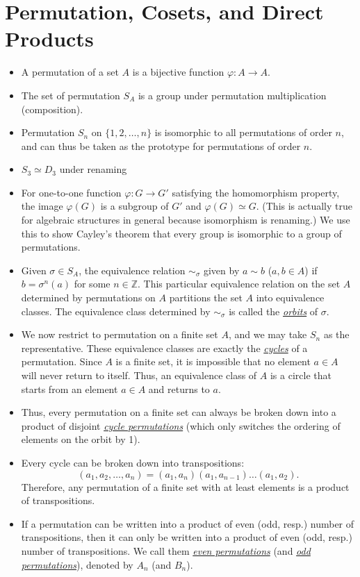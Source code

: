 \documentclass{article}
\newcommand{\df}[1]{\ul{\textit{#1}}}
\newcommand{\Z}{\mathbb{Z}}
\renewcommand{\phi}{\varphi}
\begin{document}
\section{Permutation, Cosets, and Direct Products}
\begin{itemize}
    \item A permutation of a set $A$ is a bijective function $\phi: A \to A$.
    \item The set of permutation $S_A$ is a group under permutation multiplication (composition).
    \item Permutation $S_n$ on $\{1,2,\dots,n\}$ is isomorphic to all permutations of order $n$, and can thus be taken as the prototype for permutations of order $n$.
    \item $S_3 \simeq D_3$ under renaming
    \item For one-to-one function $\phi: G \to G'$ satisfying the homomorphism property, the image $\phi(G)$ is a subgroup of $G'$ and $\phi(G) \simeq G$. (This is actually true for algebraic structures in general because isomorphism is renaming.) We use this to show Cayley's theorem that every group is isomorphic to a group of permutations.
    \item Given $\sigma \in S_A$, the equivalence relation $\sim_\sigma$ given by $a \sim b$ ($a,b \in A$) if $b = \sigma^n(a)$ for some $n \in \Z$. This particular equivalence relation on the set $A$ determined by permutations on $A$ partitions the set $A$ into equivalence classes. The equivalence class determined by $\sim_\sigma$ is called the \df{orbits} of $\sigma$.
    \item We now restrict to permutation on a finite set $A$, and we may take $S_n$ as the representative. These equivalence classes are exactly the \df{cycles} of a permutation. Since $A$ is a finite set, it is impossible that no element $a \in A$ will never return to itself. Thus, an equivalence class of $A$ is a circle that starts from an element $a \in A$ and returns to $a$.
    \item Thus, every permutation on a finite set can always be broken down into a product of disjoint \df{cycle permutations} (which only switches the ordering of elements on the orbit by 1).
    \item Every cycle can be broken down into transpositions: $$(a_1, a_2, \dots, a_n) = (a_1, a_n) (a_1, a_{n-1}) \dots (a_1,a_2).$$ Therefore, any permutation of a finite set with at least elements is a product of transpositions.
    \item If a permutation can be written into a product of even (odd, resp.) number of transpositions, then it can only be written into a product of even (odd, resp.) number of transpositions. We call them \df{even permutations} (and \df{odd permutations}), denoted by $A_n$ (and $B_n$).

\end{itemize}
\end{document}
